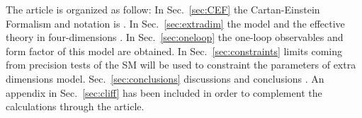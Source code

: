 The article is organized as follow: In Sec.~\ref{sec:CEF}  the Cartan-Einstein Formalism  and notation is  . In Sec.~\ref{sec:extradim} the model  and the effective theory in four-dimensions  . In Sec.~\ref{sec:oneloop} the one-loop observables and form factor of this model are obtained. In Sec.~\ref{sec:constraints} limits coming from precision tests of the SM will be used to constraint the parameters of extra dimensions model.  Sec.~\ref{sec:conclusions} discussions and conclusions  . An appendix in Sec.~\ref{sec:cliff} has been included in order to complement the calculations through the article.
